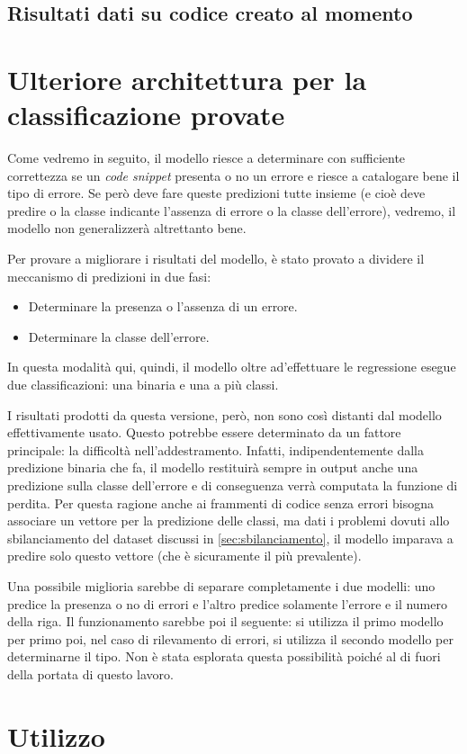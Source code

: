 \subsection{Risultati dati su codice creato al momento}



\section{Ulteriore architettura per la classificazione provate}
Come vedremo in seguito, il modello riesce a determinare con sufficiente correttezza se un \textit{code snippet} presenta o no un errore e riesce a catalogare bene il tipo di errore.
Se però deve fare queste predizioni tutte insieme (e cioè deve predire o la classe indicante l'assenza di errore o la classe dell'errore), vedremo, il modello non generalizzerà altrettanto bene.

Per provare a migliorare i risultati del modello, è stato provato a dividere il meccanismo di predizioni in due fasi:
    \begin{itemize}
        \item Determinare la presenza o l'assenza di un errore.
        \item Determinare la classe dell'errore.
    \end{itemize}
In questa modalità qui, quindi, il modello oltre ad'effettuare le regressione esegue due classificazioni: una binaria e una a più classi.

I risultati prodotti da questa versione, però, non sono così distanti dal modello effettivamente usato.
Questo potrebbe essere determinato da un fattore principale: la difficoltà nell'addestramento. 
Infatti, indipendentemente dalla predizione binaria che fa, il modello restituirà sempre in output anche una predizione sulla classe dell'errore e di conseguenza verrà computata la funzione di perdita.
Per questa ragione anche ai frammenti di codice senza errori bisogna associare un vettore per la predizione delle classi, ma dati i problemi dovuti allo sbilanciamento del dataset discussi in \autoref{sec:sbilanciamento},
il modello imparava a predire solo questo vettore (che è sicuramente il più prevalente).

Una possibile miglioria sarebbe di separare completamente i due modelli: uno predice la presenza o no di errori e l'altro predice solamente l'errore e il numero della riga.
Il funzionamento sarebbe poi il seguente: si utilizza il primo modello per primo poi, nel caso di rilevamento di errori, si utilizza il secondo modello per determinarne il tipo.
Non è stata esplorata questa possibilità poiché al di fuori della portata di questo lavoro. 

\section{Utilizzo}